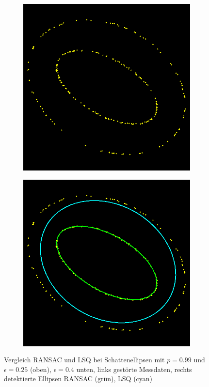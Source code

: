 \begin{figure}[!htb]
\begin{subfigure}{.5\textwidth}
	\end{subfigure}
	\begin{subfigure}{.5\textwidth}
		\centering
		\vspace{0.2cm}
		\includegraphics[width=.9\textwidth]{images/ransacShadow40_0.png}
	\end{subfigure}%
	\begin{subfigure}{.5\textwidth}
		\centering
		\vspace{0.2cm}
		\includegraphics[width=.9\textwidth]{images/ransacShadow40_1.png}
	\end{subfigure}
	\caption{Vergleich RANSAC und LSQ bei Schattenellipsen mit $p = 0.99$ und $\epsilon = 0.25$ (oben), $\epsilon = 0.4$ unten, links gestörte Messdaten, rechts detektierte Ellipsen RANSAC (grün), LSQ (cyan)}
	\label{fig:blubb}
\end{figure}



